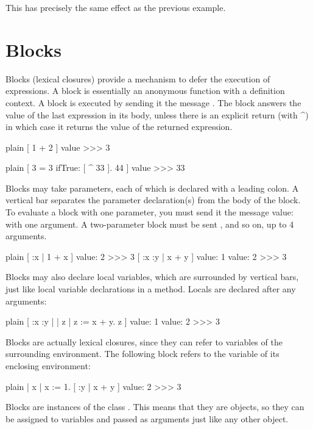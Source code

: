 \documentclass[10pt,twoside,english]{_support/latex/sbabook/sbabook}
\begin{document}
This has precisely the same effect as the previous example.
\section{Blocks}
Blocks (lexical closures) provide a mechanism to defer the execution of expressions. A block is
essentially an anonymous function with a definition context. A block is executed by sending it the
message . The block answers the value of the last expression in its
body, unless there is an explicit return (with \string^) in which case it returns the value of the returned expression.

\begin{displaycode}{plain}
[ 1 + 2 ] value 
>>> 3
\end{displaycode}

\begin{displaycode}{plain}
[ 3 = 3 ifTrue: [ ^ 33 ]. 44 ] value
>>> 33
\end{displaycode}

Blocks may take parameters, each of which is declared with a leading colon. A
vertical bar separates the parameter declaration(s) from the body of the block.
To evaluate a block with one parameter, you must send it the message value: with
one argument. A two-parameter block must be sent , and so on, up
to 4 arguments.

\begin{displaycode}{plain}
[ :x | 1 + x ] value: 2 
>>> 3
[ :x :y | x + y ] value: 1 value: 2 
>>> 3
\end{displaycode}

Blocks may also declare local variables, which are surrounded by vertical bars,
just like local variable declarations in a method. Locals are declared after any
arguments:

\begin{displaycode}{plain}
[ :x :y |
	| z |
	z := x + y.
	z ] value: 1 value: 2 
>>> 3
\end{displaycode}

Blocks are actually lexical closures, since they can refer to variables of the
surrounding environment. The following block refers to the variable  of its
enclosing environment:

\begin{displaycode}{plain}
| x |
x := 1.
[ :y | x + y ] value: 2 
>>> 3
\end{displaycode}

Blocks are instances of the class . This means that they are
objects, so they can be assigned to variables and passed as arguments just like
any other object.
\end{document}
